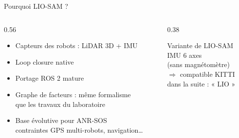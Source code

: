 \begin{frame}{Pourquoi LIO-SAM ?}
  \begin{columns}[c]
    \begin{column}{0.56\textwidth}
      \begin{itemize}
        \item[\ok] Capteurs des robots : \alert{LiDAR 3D + IMU}
        \item[\ok] \alert{Loop closure} native
        \item[\ok] Portage \alert{ROS 2} mature
        \item[\ok] \alert{Graphe de facteurs} : même formalisme\\ que les travaux du laboratoire
        \item[\ok] Base \alert{évolutive} pour ANR-SOS\\
              {\footnotesize\color{textgray} contraintes GPS multi-robots, navigation\dots}
      \end{itemize}
    \end{column}
    \begin{column}{0.38\textwidth}
      \begin{tcolorbox}[carte, title=En pratique : LIORF]
        Variante de LIO-SAM\\[4pt]
        \alert{IMU 6 axes}\\ {\footnotesize (sans magnétomètre)}\\[4pt]
        $\Rightarrow$ compatible \alert{KITTI}\\[6pt]
        {\footnotesize\color{textgray} dans la suite : « LIO »}
      \end{tcolorbox}
    \end{column}
  \end{columns}
\end{frame}

